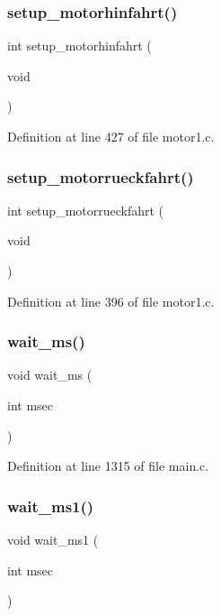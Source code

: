 \subsubsection{setup\+\_\+motorhinfahrt()}
{\footnotesize\ttfamily int setup\+\_\+motorhinfahrt (\begin{DoxyParamCaption}\item[{void}]{ }\end{DoxyParamCaption})}



Definition at line 427 of file motor1.\+c.

\mbox{\label{motor1_8c_a6fcdd3a1db9fc997a3d2130d6ceaef8c}} 
\subsubsection{setup\+\_\+motorrueckfahrt()}
{\footnotesize\ttfamily int setup\+\_\+motorrueckfahrt (\begin{DoxyParamCaption}\item[{void}]{ }\end{DoxyParamCaption})}



Definition at line 396 of file motor1.\+c.

\mbox{\label{motor1_8c_afad8aa90d3f050d853049cb8cd30a2db}} 
\subsubsection{wait\+\_\+ms()}
{\footnotesize\ttfamily void wait\+\_\+ms (\begin{DoxyParamCaption}\item[{int}]{msec }\end{DoxyParamCaption})}



Definition at line 1315 of file main.\+c.

\mbox{\label{motor1_8c_af4a649474b436de91730681e8174160e}} 
\subsubsection{wait\+\_\+ms1()}
{\footnotesize\ttfamily void wait\+\_\+ms1 (\begin{DoxyParamCaption}\item[{int}]{msec }\end{DoxyParamCaption})}



